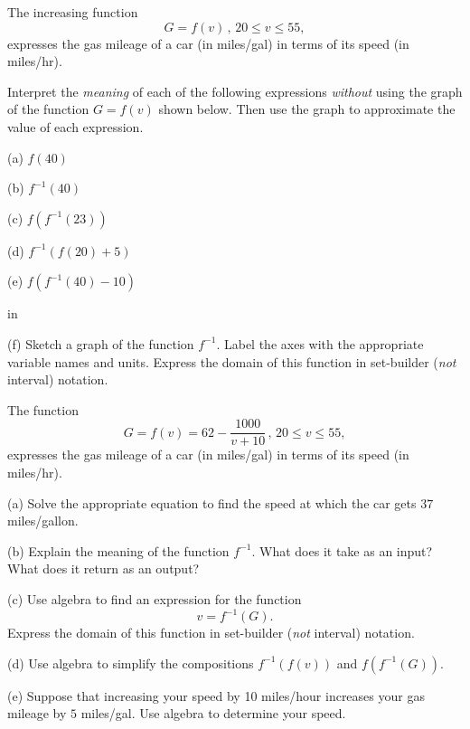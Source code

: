 \documentclass{ximera}
\newcommand{\pskip}{\vskip 0.1 in}
\begin{document}
\begin{example}  \label{Ex:9dfctghgh}
The increasing function
\[
   G = f(v) \,  , \, 20\leq v \leq 55 ,
\]
expresses the gas mileage of a car (in  miles/gal) in terms of its speed (in miles/hr). 

Interpret the \emph{meaning} of each of the following expressions \emph{without} using the graph of the function $G=f(v)$ shown below. Then use the graph to approximate the value of each expression.

(a) $f(40)$

(b) $f^{-1}(40)$

(c) $f(f^{-1}(23))$

(d) $f^{-1}(f(20) + 5)$

(e) $f(f^{-1}(40)-10)$

\begin{onlineOnly}
    \begin{center}
\end{center}
\end{onlineOnly}

\pskip

(f) Sketch a graph of the function $f^{-1}$. Label the axes with the appropriate variable names and units. Express the domain of this function in set-builder (\emph{not} interval) notation.

\end{example}

\begin{example}  \label{Ex:oodfdsfo}
The function
\[
   G = f(v) = 62 - \frac{1000}{v+10}\,  , \, 20\leq v \leq 55 ,
\]
expresses the gas mileage of a car (in  miles/gal) in terms of its speed (in miles/hr). 

(a) Solve the appropriate equation to find the speed at which the car gets $37$ miles/gallon.

(b) Explain the meaning of the function $f^{-1}$. What does it take as an input? What does it return as an output?

(c) Use algebra to find an expression for the function 
\[
    v = f^{-1}(G).
\]
Express the domain of this function in set-builder (\emph{not} interval) notation.

(d) Use algebra to simplify the compositions $f^{-1}(f(v))$ and $f(f^{-1}(G))$. 
  
(e) Suppose that increasing your speed by 10 miles/hour increases  your gas mileage by $5$ miles/gal. Use algebra to determine your speed.


\end{example}
\end{document}
